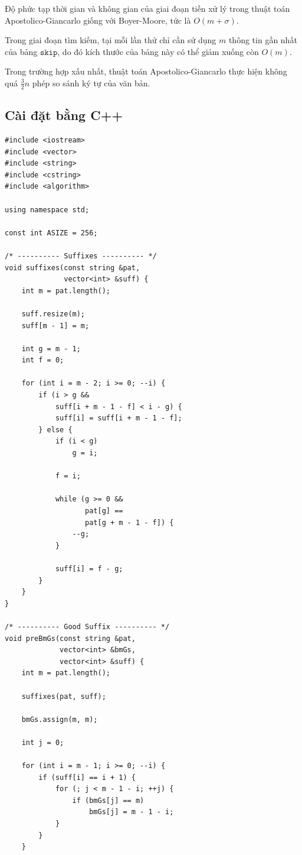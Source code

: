 Độ phức tạp thời gian và không gian của giai đoạn tiền xử lý trong thuật toán Apostolico-Giancarlo giống với Boyer-Moore, tức là $O(m+\sigma)$.

Trong giai đoạn tìm kiếm, tại mỗi lần thử chỉ cần sử dụng $m$ thông tin gần nhất của bảng $\texttt{skip}$, do đó kích thước của bảng này có thể giảm xuống còn $O(m)$.

Trong trường hợp xấu nhất, thuật toán Apostolico-Giancarlo thực hiện không quá $\frac{3}{2}n$ phép so sánh ký tự của văn bản.

\subsection{Cài đặt bằng C++}

\begin{verbatim}
#include <iostream>
#include <vector>
#include <string>
#include <cstring>
#include <algorithm>

using namespace std;

const int ASIZE = 256;

/* ---------- Suffixes ---------- */
void suffixes(const string &pat,
              vector<int> &suff) {
    int m = pat.length();

    suff.resize(m);
    suff[m - 1] = m;

    int g = m - 1;
    int f = 0;

    for (int i = m - 2; i >= 0; --i) {
        if (i > g &&
            suff[i + m - 1 - f] < i - g) {
            suff[i] = suff[i + m - 1 - f];
        } else {
            if (i < g)
                g = i;

            f = i;

            while (g >= 0 &&
                   pat[g] ==
                   pat[g + m - 1 - f]) {
                --g;
            }

            suff[i] = f - g;
        }
    }
}

/* ---------- Good Suffix ---------- */
void preBmGs(const string &pat,
             vector<int> &bmGs,
             vector<int> &suff) {
    int m = pat.length();

    suffixes(pat, suff);

    bmGs.assign(m, m);

    int j = 0;

    for (int i = m - 1; i >= 0; --i) {
        if (suff[i] == i + 1) {
            for (; j < m - 1 - i; ++j) {
                if (bmGs[j] == m)
                    bmGs[j] = m - 1 - i;
            }
        }
    }


\end{verbatim}
